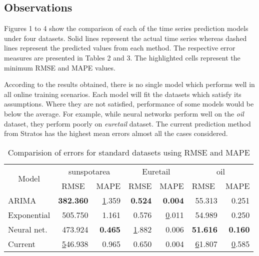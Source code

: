 \subsection{Observations}

Figures 1 to 4 show the comparison of each of the time series prediction models under four datasets. Solid lines represent the actual time series whereas dashed lines represent the predicted values from each method. The respective error measures are presented in Tables 2 and 3. The highlighted cells represent the minimum RMSE and MAPE values. 

According to the results obtained, there is no single model which performs well in all online training scenarios. Each model will fit the datasets which satisfy its assumptions. Where they are not satisfied, performance of some models would be below the average. For example, while neural networks perform well on the \textit{oil} dataset, they perform poorly on \textit{euretail} dataset. The current prediction method from Stratos has the highest mean errors almost all the cases considered.

\begin{table}[]
\centering
\caption{ Comparision of errors for standard datasets using RMSE and MAPE}
\label{my-label}
\begin{tabular}{|l|r|r|r|r|r|r|}
\hline
\multicolumn{1}{|c|}{\multirow{2}{*}{Model}} & \multicolumn{2}{c|}{sunspotarea}                      & \multicolumn{2}{c|}{Euretail}                         & \multicolumn{2}{c|}{oil}                              \\ \cline{2-7} 
\multicolumn{1}{|c|}{}                       & \multicolumn{1}{c|}{RMSE} & \multicolumn{1}{c|}{MAPE} & \multicolumn{1}{c|}{RMSE} & \multicolumn{1}{c|}{MAPE} & \multicolumn{1}{l|}{RMSE} & \multicolumn{1}{l|}{MAPE} \\ \hline
ARIMA                                        & \textbf{382.360}          & {\ul 1.359}               & \textbf{0.524}            & \textbf{0.004}            & 55.313                    & 0.251                     \\ \hline
Exponential                                  & 505.750                   & 1.161                     & 0.576                     & {\ul 0.011}               & 54.989                    & 0.250                     \\ \hline
Neural net.                                  & 473.924                   & \textbf{0.465}            & {\ul 1.882}               & 0.006                     & \textbf{51.616}           & \textbf{0.160}            \\ \hline
Current                                      & {\ul 546.938}             & 0.965                     & 0.650                     & 0.004                     & {\ul 61.807}              & {\ul 0.585}               \\ \hline
\end{tabular}
\end{table}


